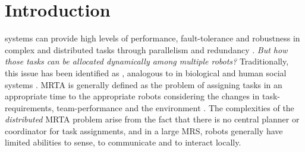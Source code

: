 \documentclass[journal]{IEEEtran}
\begin{document}
\section{Introduction}
% 
% 
% 
% 
 systems can provide high levels of performance, fault-tolerance and robustness in complex and distributed tasks through parallelism and redundancy \cite{Parker+2006}. %
 \textit{But how those tasks can be allocated dynamically among multiple robots?} Traditionally, this issue has been identified as  \cite{Gerkey+2004}, analogous to  in biological and human social systems \cite{Sendova-Franks+1999}.
MRTA is generally defined as the problem of assigning tasks in an appropriate time to the appropriate robots considering the changes in task-requirements, team-performance and the environment \cite{Gerkey+2003}. %
The complexities of the {\em distributed} MRTA problem arise from the fact that there is no central planner or coordinator for task assignments, and in a large \acl{MRS}, robots generally have limited abilities to sense, to communicate and to interact locally. %
\end{document}
